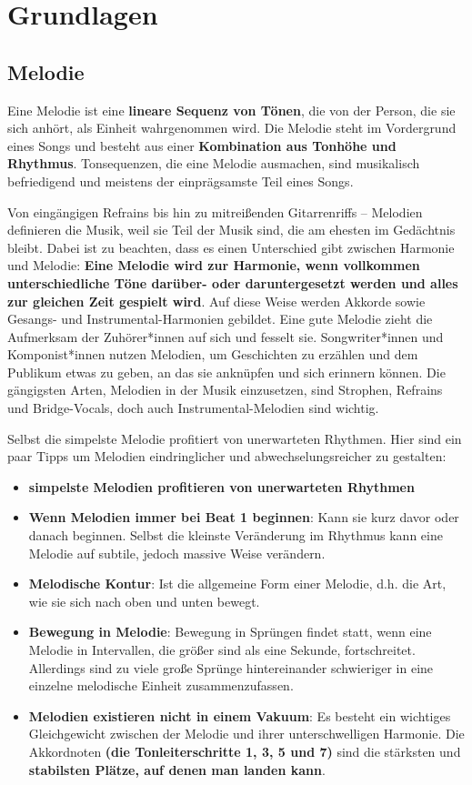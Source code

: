 \section{Grundlagen}
\subsection{Melodie}
Eine Melodie ist eine \textbf{lineare Sequenz von Tönen}, die von der Person, 
die sie sich anhört, als Einheit wahrgenommen wird. Die Melodie steht im Vordergrund 
eines Songs und besteht aus einer \textbf{Kombination aus Tonhöhe und Rhythmus}. Tonsequenzen, 
die eine Melodie ausmachen, sind musikalisch befriedigend und meistens der einprägsamste 
Teil eines Songs.

Von eingängigen Refrains bis hin zu mitreißenden Gitarrenriffs – Melodien definieren die Musik, 
weil sie Teil der Musik sind, die am ehesten im Gedächtnis bleibt. Dabei ist zu beachten, dass 
es einen Unterschied gibt zwischen Harmonie 
und Melodie: \textbf{Eine Melodie wird zur Harmonie, wenn vollkommen unterschiedliche Töne darüber- oder 
daruntergesetzt werden und alles zur gleichen Zeit gespielt wird}. Auf diese Weise werden Akkorde 
sowie Gesangs- und Instrumental-Harmonien gebildet. Eine gute Melodie zieht die Aufmerksam der 
Zuhörer*innen auf sich und fesselt sie. Songwriter*innen und Komponist*innen nutzen Melodien, 
um Geschichten zu erzählen und dem Publikum etwas zu geben, an das sie anknüpfen und sich erinnern 
können. Die gängigsten Arten, Melodien in der Musik einzusetzen, sind Strophen, Refrains und Bridge-Vocals, 
doch auch Instrumental-Melodien sind wichtig.

Selbst die simpelste Melodie profitiert von unerwarteten Rhythmen. Hier sind ein paar Tipps um Melodien 
eindringlicher und abwechselungsreicher zu gestalten:
\begin{itemize}
    \item \textbf{simpelste Melodien profitieren von unerwarteten Rhythmen}
    \item \textbf{Wenn Melodien immer bei Beat 1 beginnen}: Kann sie kurz davor oder danach beginnen. Selbst die 
    kleinste Veränderung im Rhythmus kann eine Melodie auf subtile, jedoch massive Weise verändern.
    \item \textbf{Melodische Kontur}: Ist die allgemeine Form einer Melodie, d.h. die Art, wie sie sich nach 
    oben und unten bewegt.
    \item \textbf{Bewegung in Melodie}: Bewegung in Sprüngen findet statt, wenn eine Melodie in Intervallen, die 
    größer sind als eine Sekunde, fortschreitet. Allerdings sind zu viele große Sprünge hintereinander schwieriger 
    in eine einzelne melodische Einheit zusammenzufassen.
    \item \textbf{Melodien existieren nicht in einem Vakuum}: Es besteht ein wichtiges Gleichgewicht zwischen der 
    Melodie und ihrer unterschwelligen Harmonie. Die Akkordnoten \textbf{(die Tonleiterschritte 1, 3, 5 und 7)} sind die 
    stärksten und \textbf{stabilsten Plätze, auf denen man landen kann}.
    
\end{itemize}



